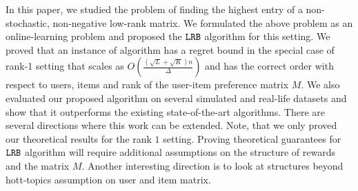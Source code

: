In this paper, we studied the problem of finding the highest entry of a non-stochastic, non-negative low-rank matrix. We formulated the above problem as an online-learning problem and proposed the ${\tt LRB}$ algorithm for this setting. We proved that an instance of algorithm has a regret bound in the special case of rank-1 setting that scales as $O\left(\frac{\left(\sqrt{L } + \sqrt{K }\right)n}{\Delta}\right)$ and has the correct order with respect to users, items and rank of the user-item preference matrix $M$. We also evaluated our proposed algorithm on several simulated and real-life datasets and show that it outperforms the existing state-of-the-art algorithms. There are several directions where this work can be extended. Note, that we only proved our theoretical results for the rank $1$ setting. Proving theoretical guarantees for ${\tt LRB}$ algorithm will require additional assumptions on the structure of rewards and the matrix $M$. Another interesting direction is to look at structures beyond hott-topics assumption on user and item matrix.

